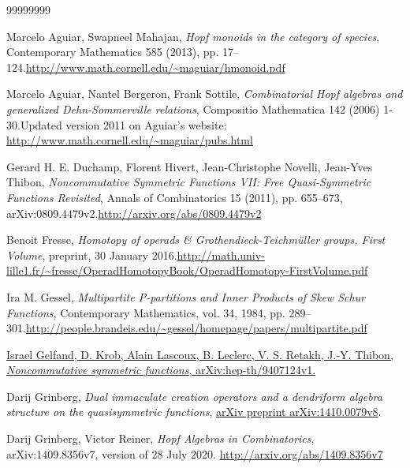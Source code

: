 \documentclass
[numbers=enddot,12pt,final,onecolumn,notitlepage,abstracton]{scrartcl}%
\theoremstyle{definition}
\begin{document}
\begin{thebibliography}{99999999}                                                                                         %


Marcelo Aguiar, Swapneel Mahajan, \textit{Hopf
monoids in the category of species}, Contemporary Mathematics 585 (2013), pp.
17--124.\newline\url{http://www.math.cornell.edu/~maguiar/hmonoid.pdf}

Marcelo Aguiar, Nantel Bergeron, Frank Sottile,
\textit{Combinatorial Hopf algebras and generalized Dehn-Sommerville
relations}, Compositio Mathematica 142 (2006) 1-30.\newline Updated version
2011 on Aguiar's website: \url{http://www.math.cornell.edu/~maguiar/pubs.html}

Gerard H. E. Duchamp, Florent Hivert, Jean-Christophe
Novelli, Jean-Yves Thibon, \textit{Noncommutative Symmetric Functions VII:
Free Quasi-Symmetric Functions Revisited}, Annals of Combinatorics 15 (2011),
pp. 655--673, arXiv:0809.4479v2.\newline\url{http://arxiv.org/abs/0809.4479v2}

Benoit Fresse, \textit{Homotopy of operads \&
Grothendieck-Teichm\"{u}ller groups, First Volume}, preprint, 30 January
2016.\newline\url{http://math.univ-lille1.fr/~fresse/OperadHomotopyBook/OperadHomotopy-FirstVolume.pdf}

Ira M. Gessel, \textit{Multipartite P-partitions and
Inner Products of Skew Schur Functions}, Contemporary Mathematics, vol. 34,
1984, pp. 289--301.\newline\url{http://people.brandeis.edu/~gessel/homepage/papers/multipartite.pdf}

\href{https://arxiv.org/abs/hep-th/9407124v1}{Israel
Gelfand, D. Krob, Alain Lascoux, B. Leclerc, V. S. Retakh, J.-Y. Thibon,
\textit{Noncommutative symmetric functions}, arXiv:hep-th/9407124v1.}

Darij Grinberg, \textit{Dual immaculate creation
operators and a dendriform algebra structure on the quasisymmetric functions},
\href{http://arxiv.org/abs/1410.0079v8}{arXiv preprint arXiv:1410.0079v8}.

Darij Grinberg, Victor Reiner, \textit{Hopf Algebras
in Combinatorics}, arXiv:1409.8356v7, version of 28 July 2020. \newline\url{http://arxiv.org/abs/1409.8356v7}


\end{thebibliography}
\end{document}
